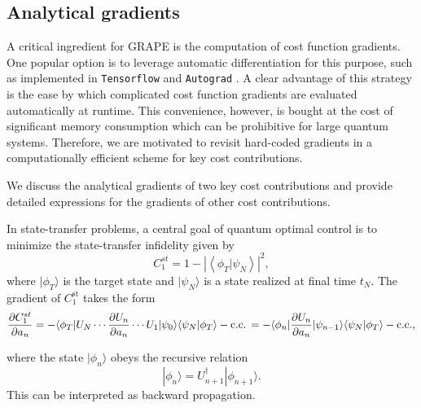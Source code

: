 \documentclass[12pt]{article}
\DeclareMathOperator{\cc}{c.c.}
\newcommand{\dket}[1]{|#1\rangle}
\begin{document}
\subsection{Analytical gradients}
\label{gradients main text}
A critical ingredient for GRAPE is the computation of cost function gradients. One popular option is to leverage automatic differentiation for this purpose, such as implemented in \texttt{Tensorflow} \cite{tensorflow2015-whitepaper} and \texttt{Autograd} \cite{maclaurin2015autograd}. A clear advantage of this strategy is the ease by which complicated cost function gradients are evaluated automatically at runtime. This convenience, however, is bought at the cost of significant memory consumption which can be prohibitive for large quantum systems.
Therefore, we are motivated to revisit hard-coded gradients in a computationally efficient scheme for key cost contributions.


We discuss the analytical gradients of two key cost contributions and provide detailed expressions for the gradients of other cost contributions.

In state-transfer problems, a central goal of quantum optimal control is to minimize the state-transfer infidelity given by 
\begin{equation}
\label{C1st}
    C_1^
{st}=1-\left|\left\langle\phi_T | \psi_{N}\right\rangle\right|^{2},
\end{equation} 
where $\dket{\phi_T}$ is the target state and $\dket{\psi_N}$ is a state realized at final time $t_N$. The gradient of $C_1^{\text{st}}$ takes the form
\begin{equation}
\label{stgradient}
    \frac{\partial C_1^{st} }{\partial a_{ n}}
  =- \langle\phi_T|U_N\cdots \frac {\partial U_{n}}{\partial a_{n}}\cdots U_1|\psi_0\rangle\langle\psi_N|\phi_T\rangle -\cc\\
=-\langle\phi_{n}|\frac {\partial U_n }{\partial a_{n}}|\psi_{n-1}\rangle\langle\psi_N|\phi_T\rangle - \cc ,
\end{equation}
 
where the state $\dket{\phi_{n}}$ obeys the recursive relation
\begin{equation}
    \dket{\phi_{n}}=U_{n+1}^\dagger\dket{\phi_{n+1}}.
\end{equation}
This can be interpreted as backward propagation.
\end{document}

